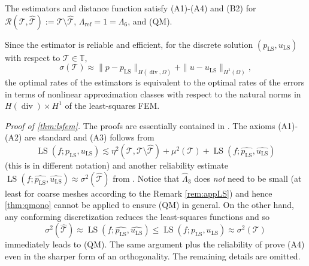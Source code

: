 \documentclass{siamltex1213}
\begin{document}
\begin{theorem}[A1--A4] \label{thm:lsfem}
The estimators and distance function satisfy (A1)-(A4) and (B2) for 
$\mathcal{R}({\mathcal{T}},{\hat{\mathcal{T}}}):={\mathcal{T}}\setminus{\hat{\mathcal{T}}}$, ${\ensuremath{\Lambda_{\mathrm{ref}}}}=1={\ensuremath{\Lambda_{\mathrm{6}}}}$, and (QM). 
\end{theorem}

Since the estimator is reliable and efficient, for the discrete solution $({p_{\operatorname{LS}}},{u_{\operatorname{LS}}})$ with respect to 
${\mathcal{T}}\in{\mathbb T}$, 
\[
\sigma({\mathcal{T}})\approx \| p-{p_{\operatorname{LS}}}\|_{H(\operatorname{div},\Omega)}+\| u-{u_{\operatorname{LS}}}\|_{H^1(\Omega)},
\] 
the optimal rates of the estimators is equivalent to the optimal rates of the errors in terms of nonlinear approximation 
classes with respect to the natural norms in $H(\operatorname{div})\times H^1$ of the least-squares FEM.

\textit{Proof of \cref{thm:lsfem}.}
The proofs are essentially contained in  \cite{CCP-lsfem}. The axioms (A1)-(A2) are standard and (A3) follows 
from
\[
\operatorname{LS}(f; {p_{\operatorname{LS}}},{u_{\operatorname{LS}}})\lesssim \eta^2({\mathcal{T}},{\mathcal{T}}\setminus{\hat{\mathcal{T}}})+\mu^2({\mathcal{T}}) 
+ \operatorname{LS}(f; \widehat{p_{\operatorname{LS}}},\widehat{u_{\operatorname{LS}}})
\]
(this is \cite[p 59, line 24]{CCP-lsfem} in different notation) and another reliability estimate 
$ \operatorname{LS}(f; \widehat{p_{\operatorname{LS}}},\widehat{u_{\operatorname{LS}}})\approx \sigma^2({\hat{\mathcal{T}}})$ from \cite[Thm 3.1]{CCP-lsfem}.
Notice that ${\ensuremath{\widehat{\Lambda}_{\mathrm{3}}}}$ does {\em not} need to be small (at least for coarse meshes according to the Remark \ref{rem:appLS}) and hence \cref{thm:qmono} cannot be applied to ensure (QM) in general. On the other hand, any conforming discretization reduces the least-squares functions and so 
\[
\sigma^2({\hat{\mathcal{T}}})\approx  \operatorname{LS}(f; \widehat{p_{\operatorname{LS}}},\widehat{u_{\operatorname{LS}}})\le 
 \operatorname{LS}(f; {p_{\operatorname{LS}}},{u_{\operatorname{LS}}})\approx \sigma^2({\mathcal{T}})
\]
immediately leads to (QM).
The same argument plus the reliability of \cite[Theorem 3.1]{CCP-lsfem} prove (A4) even in the sharper form of an orthogonality. The remaining details are omitted.
\qquad \endproof
\end{document}
